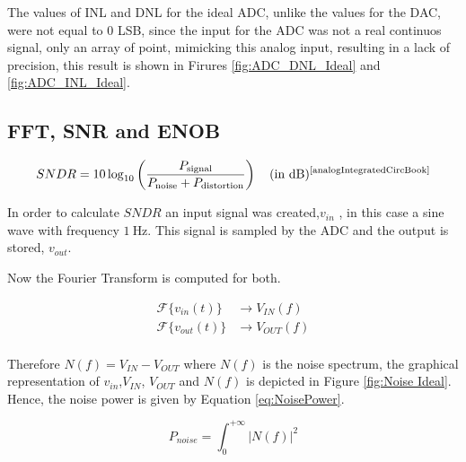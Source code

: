 The values of INL and DNL for the ideal ADC, unlike the values for the DAC, were not equal to $0$ LSB, since the input for the ADC was not a real continuos signal, only an array of point, mimicking this analog input, resulting in a lack of precision, this result is shown in Firures \ref{fig:ADC_DNL_Ideal} and \ref{fig:ADC_INL_Ideal}.

\subsection{FFT, SNR and ENOB}

\begin{equation}
    SNDR = 10 \log_{10} \left( \frac{P_{\text{signal}}}{P_{\text{noise}} + P_{\text{distortion}}} \right)  \quad \text{(in dB)} \textsuperscript{\cite{analogIntegratedCircBook}}
    \label{eq:SNDR}
\end{equation}

In order to calculate $SNDR$ an input signal was created,$v_{in}$ , in this case a sine wave with frequency $\SI{1}{\hertz}$. This signal is sampled by the ADC and the output is stored, $v_{out}$.

Now the Fourier Transform is computed for both.

\begin{equation}
    \begin{split}
        \mathcal{F}\{v_{in}(t)\} &\rightarrow V_{IN}(f)\\
        \mathcal{F}\{v_{out}(t)\} &\rightarrow V_{OUT}(f)\\
    \end{split}
    \label{eq:fourier}
\end{equation}

Therefore $N(f) = V_{IN} - V_{OUT}$ where $N(f)$ is the noise spectrum, the graphical representation of $v_{in}$,$V_{IN}$, $V_{OUT}$ and $N(f)$ is depicted in Figure \ref{fig:Noise Ideal}. Hence, the noise power is given by Equation \ref{eq:NoisePower}.

\begin{equation}
    P_{noise} = \int_{0}^{+\infty}|N(f)|^2 
    \label{eq:NoisePower}
\end{equation}

